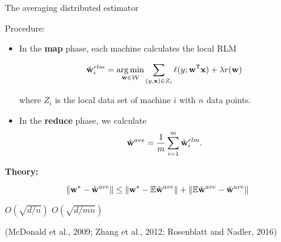 \begin{frame}{The averaging distributed estimator}

Procedure:

\begin{itemize}


\item In the \textbf{map} phase, each machine calculates the local RLM 

\begin{equation}
\hat{\mathbf{w}}^{rlm}_i = \operatorname*{arg\,min}_{\mathbf{w}\in{\mathcal{W}}} \sum_{(y,\mathbf{x})\in Z_i} \ell(y;{\mathbf{w}}^{\mathsf{T}}\mathbf{x}) + \lambda r(\mathbf{w})
\end{equation}

where $Z_i$ is the local data set of machine $i$ with $n$ data points.


\item
In the \textbf{reduce} phase, we calculate
\begin{equation}
\hat{\mathbf{w}}^{ave} = \frac{1}{m}\sum_{i=1}^m \hat{\mathbf{w}}^{rlm}_i
.
\end{equation}

\end{itemize}

\textbf{Theory:}

\vspace{-0.2in}
\begin{equation}
{\lVert {{\mathbf{w}^{*}}-\hat{\mathbf{w}}^{ave}} \rVert} \le 
{\lVert {{\mathbf{w}^{*}}-\mathbb{E}\hat{\mathbf{w}}^{ave}} \rVert} 
+
{\lVert {\mathbb{E}\hat{\mathbf{w}}^{ave}-\hat{\mathbf{w}}^{ave}} \rVert} 
\end{equation}

\hspace{1.9in}
$O(\sqrt{d/n})$
\hspace{0.3in}
$O(\sqrt{d/mn})$

\vspace{0.15in}
(McDonald et al., 2009; Zhang et al., 2012; Rosenblatt and Nadler, 2016)
\end{frame}


